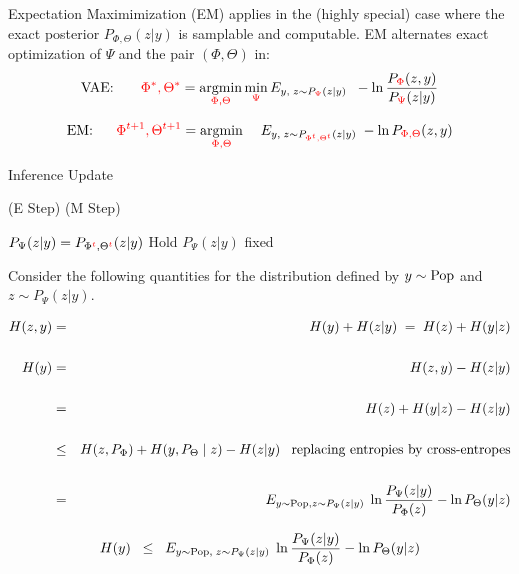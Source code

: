 {

Expectation Maximimization (EM) applies in the (highly special) case where the exact posterior $P_{\Phi,\Theta}(z|y)$ is samplable and computable.
EM alternates exact optimization of $\Psi$ and the pair $(\Phi,\Theta)$ in:
$$\mbox{VAE:}\;\;\;\;\;\;\; {\color{red} \Phi^*,\Theta^*} = \operatorname*{argmin}_{\color{red} \Phi,\Theta} \min_{\color{red} \Psi} E_{y,\;z \sim P_{\color{red} \Psi}(z|y)}\;\;- \ln \frac{P_{\color{red} \Phi}(z,y)}{P_{\color{red} \Psi}(z|y)}$$

\vfill
$$\mbox{EM:}\;\;\;\;\;\; {\color{red} \Phi^{t+1},\Theta^{t+1}} =  \operatorname*{argmin}_{\color{red} \Phi,\Theta}\;\;\;\;E_{y,\;z \sim P_{\color{red} \Phi^t,\Theta^t}(z|y)}\; - \ln P_{\color{red} \Phi,\Theta}(z,y)$$

\vfill
\centerline{\hspace{1em} Inference \hspace{6em} Update \hspace{2.5em}~}
\centerline{(E Step) \hspace{6em} (M Step) ~}
\centerline{ $P_\Psi(z|y) = P_{\Phi^{\color{red} t},\Theta^{\color{red} t}}(z|y)$ \hspace{2.5em} Hold $P_\Psi(z|y)$ fixed \hspace{0em}~}


Consider the following quantities for the distribution defined by $y \sim \mathrm{Pop}$ and $z \sim P_\Psi(z|y)$.

{\huge
\begin{eqnarray*}
H(z,y) & = & H(y) + H(z|y) \; = \;H(z) + H(y|z) \\
\\
H(y) & = & H(z,y) - H(z|y) \\
\\
& = & H(z) + H(y|z) - H(z|y) \\
\\
& \leq & H(z,P_\Phi) + H(y,P_\Theta\;|\;z) - H(z|y) \;\;\;\mbox{replacing entropies by cross-entropes} \\
\\
& = & E_{y \sim \mathrm{Pop}, z\sim P_\Psi(z|y)}\;\ln\frac{P_\Psi(z|y)}{P_\Phi(z)} - \ln P_\Theta(y|z)
\end{eqnarray*}
}


$$H(y)\;\; \leq \;\;  E_{y \sim \mathrm{Pop},\;z \sim P_\Psi(z|y)}\;\ln\frac{P_\Psi(z|y)}{P_\Phi(z)} - \ln P_\Theta(y|z)$$

}
